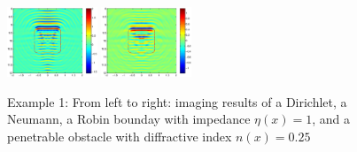\documentclass[utf-8,8pt]{beamer}
\begin{document}
\begin{frame}
\begin{figure}
 	\includegraphics[width=0.24\textwidth]{./graphic/rectangle_3pi_impedance_1.eps}
 	\includegraphics[width=0.24\textwidth]{./graphic/rectangle_3pi_transmission.eps}
 	\caption{Example 1: From left to right: imaging results of a Dirichlet, a Neumann, a Robin bounday with impedance $\eta(x)=1$, and a penetrable obstacle with diffractive index $n(x)=0.25$}
 \end{figure}
\end{frame}
\end{document}
